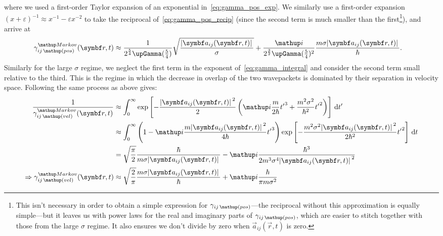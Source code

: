 where we used a first-order Taylor expansion of an exponential in~\eqref{eq:gamma_pos_exp}. We similarly use a first-order expansion $(x + \varepsilon)^{-1} \approx x^{-1} - \varepsilon x^{-2}$ to take the reciprocal of~\eqref{eq:gamma_pos_recip} (since the second term is much smaller than the first\footnote{This isn't necessary in order to obtain a simple expression for $\gamma_{ij\,\up{(pos)}}$---the reciprocal without this approximation is equally simple---but it leaves us with power laws for the real and imaginary parts of $\gamma_{ij\,\up{(pos)}}$, which are easier to stitch together with those from the large $\sigma$ regime. It also ensures we don't divide by zero when $\vec a_{ij}(\vec r, t)$ is zero.}), and arrive at
\begin{align}
\gamma_{ij\,\up{(pos)}}^\up{Markov}(\vec r, t) &\approx \frac1{2^{\frac54}\upGamma(\tfrac54)}\sqrt{\frac{\abs{\vec a_{ij}(\vec r, t)}}{\sigma}}
+ \frac \ii {2^{\frac32}\upGamma(\tfrac54)^2} \frac{m\sigma \abs{\vec a_{ij}(\vec r, t)}}{\hbar}.\label{eq:gamma_pos_final}%
\end{align}
Similarly for the large $\sigma$ regime, we neglect the first term in the exponent of~\eqref{eq:gamma_integral} and consider the second term small relative to the third. This is the regime in which the decrease in overlap of the two wavepackets is dominated by their separation in velocity space. Following the same process as above gives:
\begin{align}
\frac1{\gamma_{ij\,\up{(vel)}}^\up{Markov}(\vec r, t)} &\approx 
  \int_0^\infty 
    \exp\left[
      -\frac {\abs{\vec a_{ij}(\vec r, t)}^2} 2 \left(\ii\frac m{2\hbar}{t^\prime}^3  + \frac{m^2\sigma^2}{\hbar^2} {t^\prime}^2 \right)
      \right]
    \,\dd t^\prime\\
      &\approx \int_0^\infty 
      \left(1 -\ii \frac {m\abs{\vec a_{ij}(\vec r, t)}^2}{4\hbar} {t^\prime}^3\right)
      \exp\left[-\frac{m^2\sigma^2\abs{\vec a_{ij}(\vec r, t)}^2}{2\hbar^2} {t^\prime}^2\right]\, \dd t\\
      & = \sqrt{\frac\pi2}\frac\hbar{m \sigma \abs{\vec a_{ij}(\vec r, t)}} - \ii\frac{\hbar^3}{2m^3 \sigma^4 \abs{\vec a_{ij}(\vec r, t)}^2}\\
      \Rightarrow \gamma_{ij\,\up{(vel)}}^\up{Markov}(\vec r, t) &\approx \sqrt{\frac2\pi}\frac{m \sigma \abs{\vec a_{ij}(\vec r, t)}}\hbar
                                          + \ii \frac\hbar{\pi m \sigma^2}
                                          \label{eq:gamma_vel_final}
\end{align}
